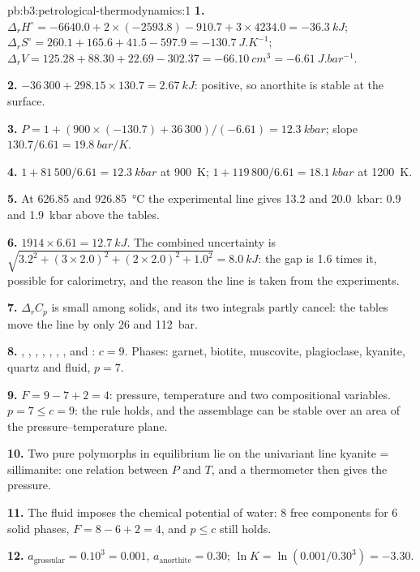 \begin{solution}{pb:b3:petrological-thermodynamics:1}
\textbf{1.} $\Delta_rH^\circ = -6640.0 + 2\times(-2593.8) - 910.7 + 3\times4234.0
= \qty{-36.3}{kJ}$; $\Delta_rS^\circ = 260.1 + 165.6 + 41.5 - 597.9 =
\qty{-130.7}{J.K^{-1}}$; $\Delta_rV = 125.28 + 88.30 + 22.69 - 302.37 =
\qty{-66.10}{cm^3} = \qty{-6.61}{J.bar^{-1}}$.

\textbf{2.} $-36\,300 + 298.15\times130.7 = \qty{+2.67}{kJ}$: positive, so
anorthite is stable at the surface.

\textbf{3.} $P = 1 + (900\times(-130.7) + 36\,300)/(-6.61) = \qty{12.3}{kbar}$;
slope $130.7/6.61 = \qty{19.8}{bar/K}$.

\textbf{4.} $1 + 81\,500/6.61 = \qty{12.3}{kbar}$ at \qty{900}{K}; $1 +
119\,800/6.61 = \qty{18.1}{kbar}$ at \qty{1200}{K}.

\textbf{5.} At 626.85 and \qty{926.85}{\celsius} the experimental line gives
13.2 and \qty{20.0}{kbar}: 0.9 and \qty{1.9}{kbar} above the tables.

\textbf{6.} $1914\times6.61 = \qty{12.7}{kJ}$. The combined uncertainty is
$\sqrt{3.2^2 + (3\times2.0)^2 + (2\times2.0)^2 + 1.0^2} = \qty{8.0}{kJ}$: the
gap is 1.6 times it, possible for calorimetry, and the reason the line is
taken from the experiments.

\textbf{7.} $\Delta_rC_p$ is small among solids, and its two integrals partly
cancel: the tables move the line by only 26 and \qty{112}{bar}.

\textbf{8.} , , , , , ,
,  and : $c = 9$. Phases: garnet, biotite,
muscovite, plagioclase, kyanite, quartz and fluid, $p = 7$.

\textbf{9.} $F = 9 - 7 + 2 = 4$: pressure, temperature and two compositional
variables. $p = 7 \le c = 9$: the rule holds, and the assemblage can be stable
over an area of the pressure--temperature plane.

\textbf{10.} Two pure  polymorphs in equilibrium lie on the
univariant line kyanite = sillimanite: one relation between $P$ and $T$, and a
thermometer then gives the pressure.

\textbf{11.} The fluid imposes the chemical potential of water: 8 free
components for 6 solid phases, $F = 8 - 6 + 2 = 4$, and $p \le c$ still
holds.

\textbf{12.} $a_{\text{grossular}} = 0.10^3 = 0.001$, $a_{\text{anorthite}} =
0.30$; $\ln K = \ln(0.001/0.30^3) = -3.30$.


\end{solution}
